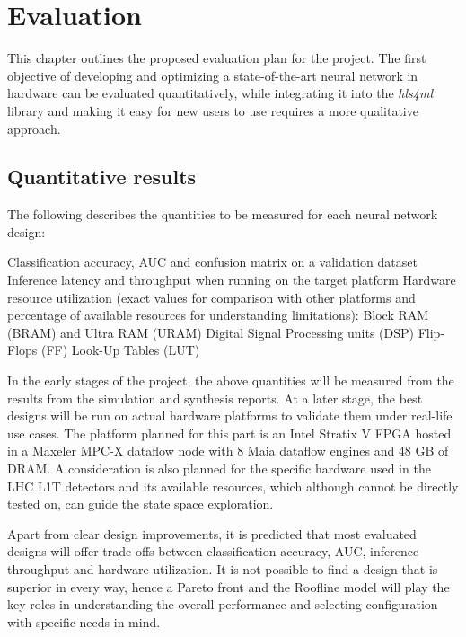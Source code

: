 \chapter{Evaluation}\label{evaluation}
This chapter outlines the proposed evaluation plan for the project. The first objective of developing and optimizing a state-of-the-art neural network in hardware can be evaluated quantitatively, while integrating it into the \textit{hls4ml} library and making it easy for new users to use requires a more qualitative approach.


\section{Quantitative results}
The following describes the quantities to be measured for each neural network design:

\begin{outline}
  \1 Classification accuracy, AUC and confusion matrix on a validation dataset
  \1 Inference latency and throughput when running on the target platform
  \1 Hardware resource utilization (exact values for comparison with other platforms and percentage of available resources for understanding limitations):
    \2 Block RAM (BRAM) and Ultra RAM (URAM)
    \2 Digital Signal Processing units (DSP)
    \2 Flip-Flops (FF)
    \2 Look-Up Tables (LUT)
\end{outline}

In the early stages of the project, the above quantities will be measured from the results from the simulation and synthesis reports. At a later stage, the best designs will be run on actual hardware platforms to validate them under real-life use cases. The platform planned for this part is an Intel Stratix V FPGA hosted in a Maxeler MPC-X dataflow node with 8 Maia dataflow engines and 48 GB of DRAM. A consideration is also planned for the specific hardware used in the LHC L1T detectors and its available resources, which although cannot be directly tested on, can guide the state space exploration.

Apart from clear design improvements, it is predicted that most evaluated designs will offer trade-offs between classification accuracy, AUC, inference throughput and hardware utilization. It is not possible to find a design that is superior in every way, hence a Pareto front and the Roofline model will play the key roles in understanding the overall performance and selecting configuration with specific needs in mind.


